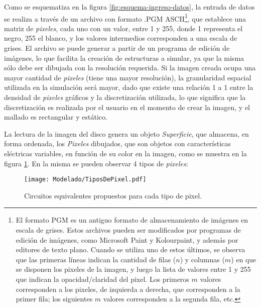 Como se esquematiza en la figura \ref{fig:esquema-ingreso-datos}, la entrada de datos se realiza a través de un archivo con formato \textsc{.PGM} ASCII\footnote{El formato PGM es un antiguo formato de almacenamiento de imágenes en escala de grises. Estos archivos pueden ser modificados por programas de edición de imágenes, como Microsoft Paint y Kolourpaint, y además por editores de texto plano. Cuando se utiliza uno de estos últimos, se observa que las primeras líneas indican la cantidad de filas ($n$) y columnas ($m$) en que se disponen los pixeles de la imagen, y luego la lista de valores entre 1 y 255 que indican la opacidad/claridad del pixel. Los primeros $m$ valores corresponden a los pixeles, de izquierda a derecha, que corresponden a la primer fila; los siguientes $m$ valores corresponden a la segunda fila, etc.}, que establece una matriz de \textit{pixeles}, cada uno con un valor, entre 1 y 255, donde 1 representa el negro, 255 el blanco, y los valores intermedios corresponden a una escala de grises. El archivo se puede generar a partir de un programa de edición de imágenes, lo que facilita la creación de estructuras a simular, ya que la misma sólo debe ser dibujada con la resolución requerida. Si la imagen creada ocupa una mayor cantidad de \textit{pixeles} (tiene una mayor resolución), la granularidad espacial utilizada en la simulación será mayor, dado que existe una relación 1 a 1 entre la densidad de \textit{pixeles} gráficos y la discretización utilizada, lo que significa que la discretización es realizada por el usuario en el momento de crear la imagen, y el mallado es rectangular y estático.

La lectura de la imagen del disco genera un objeto \textit{Superficie}, que almacena, en forma ordenada, los \textit{Pixeles} dibujados, que son objetos con características eléctricas variables, en función de su color en la imagen, como se muestra en la figura \ref{fig:tiposdepixeles}. En la misma se pueden observar 4 tipos de \textit{pixeles}:

\begin{figure}[h]
	\centering
	\texttt{[image: Modelado/TiposDePixel.pdf]}
	\caption{Circuitos equivalentes propuestos para cada tipo de pixel.}
	\label{fig:tiposdepixeles}
\end{figure}

